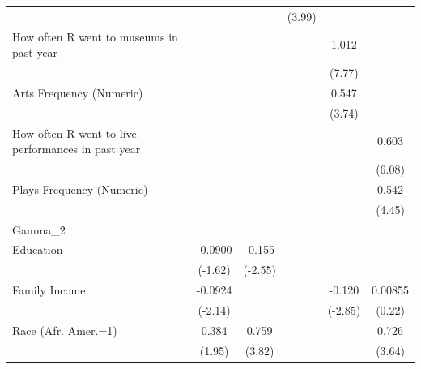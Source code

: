 {\begin{longtable}{l*{5}{c}}
                    &                   &                   &      (3.99)       &                   &                   \\
How often R went to museums in past year&                   &                   &                   &       1.012\sym{*}&                   \\
                    &                   &                   &                   &      (7.77)       &                   \\
Arts Frequency (Numeric)&                   &                   &                   &       0.547\sym{*}&                   \\
                    &                   &                   &                   &      (3.74)       &                   \\
How often R went to live performances in past year&                   &                   &                   &                   &       0.603\sym{*}\\
                    &                   &                   &                   &                   &      (6.08)       \\
Plays Frequency (Numeric)&                   &                   &                   &                   &       0.542\sym{*}\\
                    &                   &                   &                   &                   &      (4.45)       \\
\midrule
Gamma\_2             &                   &                   &                   &                   &                   \\
Education           &     -0.0900       &      -0.155\sym{*}&                   &                   &                   \\
                    &     (-1.62)       &     (-2.55)       &                   &                   &                   \\
Family Income       &     -0.0924\sym{*}&                   &                   &      -0.120\sym{*}&     0.00855       \\
                    &     (-2.14)       &                   &                   &     (-2.85)       &      (0.22)       \\
Race (Afr. Amer.=1) &       0.384\sym{*}&       0.759\sym{*}&                   &                   &       0.726\sym{*}\\
                    &      (1.95)       &      (3.82)       &                   &                   &      (3.64)       \\

\end{longtable}}
